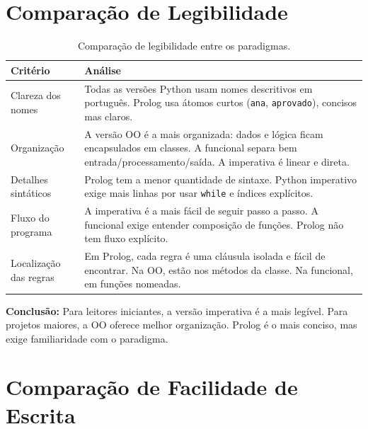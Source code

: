 \documentclass[12pt, a4paper]{article}
\begin{document}
\section{Comparação de Legibilidade}

\begin{table}[h]
\centering
\begin{tabularx}{\textwidth}{lX}
\toprule
\textbf{Critério} & \textbf{Análise} \\
\midrule
Clareza dos nomes & Todas as versões Python usam nomes descritivos em português. Prolog usa átomos curtos (\texttt{ana}, \texttt{aprovado}), concisos mas claros. \\
\addlinespace
Organização & A versão OO é a mais organizada: dados e lógica ficam encapsulados em classes. A funcional separa bem entrada/processamento/saída. A imperativa é linear e direta. \\
\addlinespace
Detalhes sintáticos & Prolog tem a menor quantidade de sintaxe. Python imperativo exige mais linhas por usar \texttt{while} e índices explícitos. \\
\addlinespace
Fluxo do programa & A imperativa é a mais fácil de seguir passo a passo. A funcional exige entender composição de funções. Prolog não tem fluxo explícito. \\
\addlinespace
Localização das regras & Em Prolog, cada regra é uma cláusula isolada e fácil de encontrar. Na OO, estão nos métodos da classe. Na funcional, em funções nomeadas. \\
\bottomrule
\end{tabularx}
\caption{Comparação de legibilidade entre os paradigmas.}
\end{table}

\textbf{Conclusão:} Para leitores iniciantes, a versão imperativa é a mais legível. Para projetos maiores, a OO oferece melhor organização. Prolog é o mais conciso, mas exige familiaridade com o paradigma.

\section{Comparação de Facilidade de Escrita}
\end{document}
